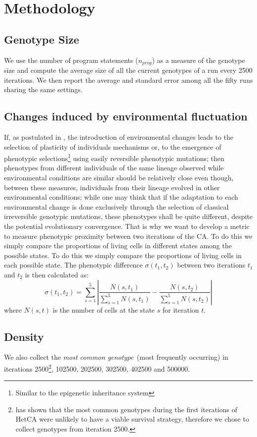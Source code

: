 \documentclass[letterpaper]{article}
\begin{document}
\section{Methodology}\label{sec:method}

\subsection{Genotype Size}
We use the number of program statements ($n_{prog}$) as a measure of the genotype size and compute the average size of all the current genotypes of a run every 2500 iterations. We then report the average and standard error among all the fifty runs sharing the same settings.

\subsection{Changes induced by environmental fluctuation}
If, as postulated in \citep{jablonka2014evolution}, the introduction of environmental changes leads to the selection of plasticity of individuals mechanisms or, to the emergence of phenotypic selections\footnote{Similar to the epigenetic inheritance system} using easily reversible phenotypic mutations; then phenotypes from different individuals of the same lineage observed while environmental conditions are similar should be relatively close even though, between these measures, individuals from their lineage evolved in other environmental conditions; while one may think that if the adaptation to each environmental change is done exclusively through the selection of classical irreversible genotypic mutations, these phenotypes shall be quite different, despite the potential evolutionary convergence. That is why we want to develop a metric to measure phenotypic proximity between two iterations of the CA. To do this we simply compare the proportions of living cells in different states among the possible states. To do this we simply compare the proportions of living cells in each possible state. The phenotypic difference $\sigma(t_1,t_2)$ between two iterations $t_1$ and $t_2$ is then calculated as:
$$\sigma(t_1,t_2) = \sum_{s=1}^5 | \frac{N(s,t_1)}{\sum_{s=1}^5 N(s,t_1)}-\frac{N(s,t_2)}{\sum_{s=1}^5 N(s,t_2)}|$$ where $N(s,t)$ is the number of cells at the state $s$ for iteration $t$.

\subsection{Density}
We also collect the \emph{most common genotype}~(most frequently occurring) in iterations 2500\footnote{\citep{medernach2015evolutionary}  has shown that the most common genotypes during the first iterations of HetCA were unlikely to have a viable survival strategy, therefore we chose to collect genotypes from iteration 2500.}, 102500, 202500, 302500, 402500 and 500000. 
\end{document}
